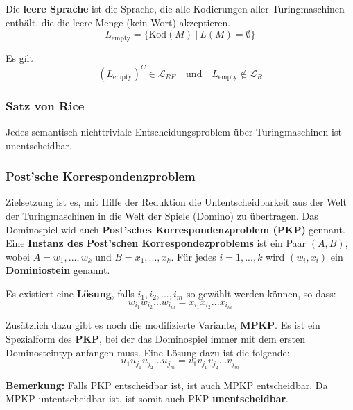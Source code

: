 \documentclass[11pt]{article}
\begin{document}
Die \textbf{leere Sprache} ist die Sprache, die alle Kodierungen aller Turingmaschinen enth{\"a}lt, die die leere Menge (kein Wort) akzeptieren.
\begin{equation*}
	L_\text{empty} = \{\text{Kod}(M)\ |\ L(M) = \emptyset\}
\end{equation*}

Es gilt
\begin{equation*}
	(L_\text{empty})^C \in \mathcal{L}_{RE} \quad\text{und}\quad L_\text{empty} \not\in \mathcal{L}_{R}
\end{equation*}

\subsubsection{Satz von Rice}

Jedes semantisch nichttriviale Entscheidungsproblem über Turingmaschinen ist unentscheidbar. 

\subsubsection{Post'sche Korrespondenzproblem}

Zielsetzung ist es, mit Hilfe der Reduktion die Untentscheidbarkeit aus der Welt der Turingmaschinen in die Welt der Spiele (Domino) zu übertragen. Das Dominospiel wid auch \textbf{Post'sches Korrespondenzproblem (PKP)} gennant.\\

Eine \textbf{Instanz des Post'schen Korrespondezproblems} ist ein Paar $(A,B)$, wobei $A = w_1,...,w_k$ und $B = x_1,...,x_k$. Für jedes $i = 1,...,k$ wird $(w_i, x_i)$ ein \textbf{Dominiostein} genannt.

Es existiert eine \textbf{Lösung}, falls $i_1, i_2,..., i_m$ so gewählt werden können, so dass:
\begin{equation*}
	w_{i_1}w_{i_2}...w_{i_m} = x_{i_1}x_{i_2}...x_{i_m}
\end{equation*}

Zusätzlich dazu gibt es noch die modifizierte Variante, \textbf{MPKP}. Es ist ein Spezialform des \textbf{PKP}, bei der das Dominospiel immer mit dem ersten Dominosteintyp anfangen muss. Eine Lösung dazu ist die folgende:
\begin{equation*}
	u_1u_{j_1}u_{j_2}...u_{j_m} = v_1v_{j_1}v_{j_2}...v_{j_m}
\end{equation*}

\textbf{Bemerkung:} Falls PKP entscheidbar ist, ist auch MPKP entscheidbar. Da MPKP untentscheidbar ist, ist somit auch PKP \textbf{unentscheidbar}.
\end{document}
